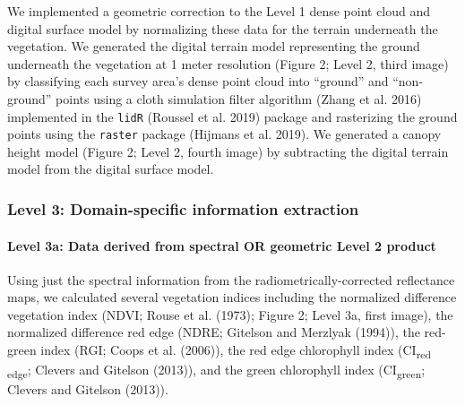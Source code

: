 \documentclass[]{article}
\let\oldparagraph\paragraph
\renewcommand{\paragraph}[1]{\oldparagraph{#1}\mbox{}}
\begin{document}
We implemented a geometric correction to the Level 1 dense point cloud
and digital surface model by normalizing these data for the terrain
underneath the vegetation. We generated the digital terrain model
representing the ground underneath the vegetation at 1 meter resolution
(Figure 2; Level 2, third image) by classifying each survey area's dense
point cloud into ``ground'' and ``non-ground'' points using a cloth
simulation filter algorithm (Zhang et al. 2016) implemented in the
\texttt{lidR} (Roussel et al. 2019) package and rasterizing the ground
points using the \texttt{raster} package (Hijmans et al. 2019). We
generated a canopy height model (Figure 2; Level 2, fourth image) by
subtracting the digital terrain model from the digital surface model.

\hypertarget{level-3-domain-specific-information-extraction}{%
\subsubsection{Level 3: Domain-specific information
extraction}\label{level-3-domain-specific-information-extraction}}

\hypertarget{level-3a-data-derived-from-spectral-or-geometric-level-2-product}{%
\paragraph{Level 3a: Data derived from spectral OR geometric Level 2
product}\label{level-3a-data-derived-from-spectral-or-geometric-level-2-product}}

Using just the spectral information from the radiometrically-corrected
reflectance maps, we calculated several vegetation indices including the
normalized difference vegetation index (NDVI; Rouse et al. (1973);
Figure 2; Level 3a, first image), the normalized difference red edge
(NDRE; Gitelson and Merzlyak (1994)), the red-green index (RGI; Coops et
al. (2006)), the red edge chlorophyll index (CI\textsubscript{red}
\textsubscript{edge}; Clevers and Gitelson (2013)), and the green
chlorophyll index (CI\textsubscript{green}; Clevers and Gitelson
(2013)).
\end{document}
